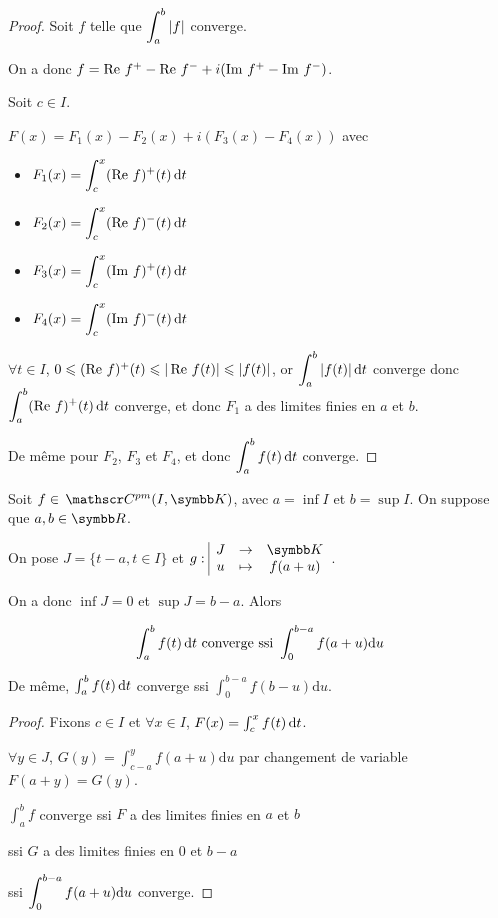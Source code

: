 \begin{proof}
    Soit $f$ telle que $\displaystyle \int_{a}^b |f|$ converge. 
    
    On a donc 
    $f = \operatorname{Re} \, f^+ - \operatorname{Re} \, f^- + i (\operatorname{Im} \, f^+ - \operatorname{Im} \, f^-)$.

    Soit $c \in I$. 

    $F(x) = F_1(x) - F_2(x) + i (F_3(x) - F_4(x))$ avec
    \begin{itemize}
        \item $F_1(x) = \displaystyle \int_c^x (\operatorname{Re} \, f)^+(t) \,\mathrm{d}t$
        \item $F_2(x) = \displaystyle \int_c^x (\operatorname{Re} \, f)^-(t) \,\mathrm{d}t$
        \item $F_3(x) = \displaystyle \int_c^x (\operatorname{Im} \, f)^+(t) \,\mathrm{d}t$
        \item $F_4(x) = \displaystyle \int_c^x (\operatorname{Im} \, f)^-(t) \,\mathrm{d}t$
    \end{itemize}

    $\forall t \in I$, $0 \leqslant (\operatorname{Re} \, f)^+(t) \leqslant |\operatorname{Re} \, f(t)| \leqslant |f(t)|$, or 
    $\displaystyle \int_{a }^{b } |f(t)| \,\mathrm{d}t$ converge donc \\ 
    $\displaystyle \int_{a }^{b } (\operatorname{Re} \, f)^+(t) \,\mathrm{d}t$ converge, 
    et donc $F_1$ a des limites finies en $a$ et $b$.

    De même pour $F_2$, $F_3$ et $F_4$, et donc $\displaystyle \int_{a }^{b } f(t) \,\mathrm{d}t$ converge. 
\end{proof}


\begin{proposition}{}{}
    Soit $f \in \mc {pm} (I, \K)$, avec $a = \inf I$ et $b = \sup I$. On suppose que $a, b \in \R$. 

    On pose $J = \{t - a, t \in I\}$ et $\fonction{g}{J}{\K}{u}{f(a + u)}$. 

    On a donc $\inf J = 0$ et $\sup J = b - a$. Alors 
    
    $$ \int_{a }^{b } f(t) \,\mathrm{d}t \text{ converge ssi } \int_{0 }^{b - a }f(a + u) \mathrm d u$$

    De même, $\int_a^b f(t) \,\mathrm{d}t$ converge ssi $\int_0^{b - a} f(b - u) \mathrm d u$. 
\end{proposition}


\begin{proof}
    Fixons $c \in I$ et $\forall x \in I$, $F(x) = \int_c^x f(t) \,\mathrm{d}t$.

    $\forall y \in J$, $G(y) = \int_{c - a}^{y} f(a + u) \mathrm d u$ par changement de variable 
    $F(a + y) = G(y)$.

    $\int_a^b f$ converge ssi $F$ a des limites finies en $a$ et $b$ 

    ssi $G$ a des limites finies en $0$ et $b - a$

    ssi $\displaystyle \int_{0}^{b - a} f(a + u) \mathrm d u$ converge.
\end{proof}


